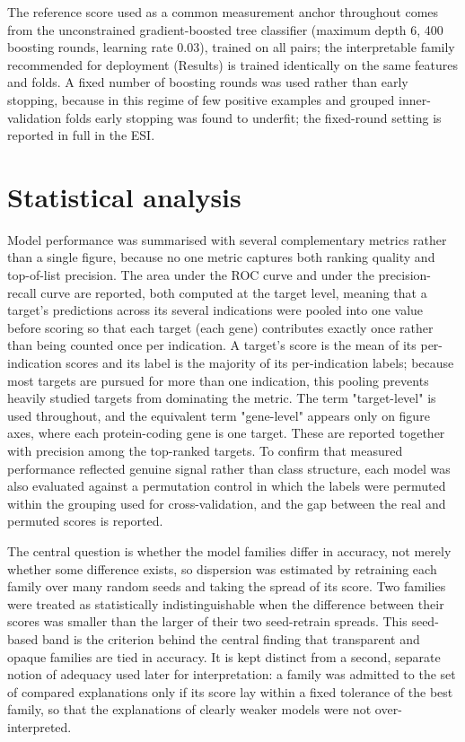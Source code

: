 \documentclass[11pt,twocolumn]{article}
\begin{document}
The reference score used as a common measurement anchor throughout comes from the unconstrained gradient-boosted tree classifier (maximum depth 6, 400 boosting rounds, learning rate 0.03), trained on all pairs; the interpretable family recommended for deployment (Results) is trained identically on the same features and folds. A fixed number of boosting rounds was used rather than early stopping, because in this regime of few positive examples and grouped inner-validation folds early stopping was found to underfit; the fixed-round setting is reported in full in the ESI.

\section{Statistical analysis}

Model performance was summarised with several complementary metrics rather than a single figure, because no one metric captures both ranking quality and top-of-list precision. The area under the ROC curve and under the precision-recall curve are reported, both computed at the target level, meaning that a target's predictions across its several indications were pooled into one value before scoring so that each target (each gene) contributes exactly once rather than being counted once per indication. A target's score is the mean of its per-indication scores and its label is the majority of its per-indication labels; because most targets are pursued for more than one indication, this pooling prevents heavily studied targets from dominating the metric. The term "target-level" is used throughout, and the equivalent term "gene-level" appears only on figure axes, where each protein-coding gene is one target. These are reported together with precision among the top-ranked targets. To confirm that measured performance reflected genuine signal rather than class structure, each model was also evaluated against a permutation control in which the labels were permuted within the grouping used for cross-validation, and the gap between the real and permuted scores is reported.

The central question is whether the model families differ in accuracy, not merely whether some difference exists, so dispersion was estimated by retraining each family over many random seeds and taking the spread of its score. Two families were treated as statistically indistinguishable when the difference between their scores was smaller than the larger of their two seed-retrain spreads. This seed-based band is the criterion behind the central finding that transparent and opaque families are tied in accuracy. It is kept distinct from a second, separate notion of adequacy used later for interpretation: a family was admitted to the set of compared explanations only if its score lay within a fixed tolerance of the best family, so that the explanations of clearly weaker models were not over-interpreted.
\end{document}
